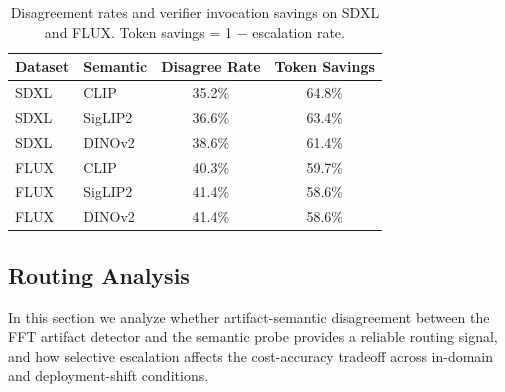 \documentclass{ieeeaccess}
\begin{document}
\begin{table}[h]
\large
\centering
\caption{Deployment shift results on SDXL and FLUX. Semantic probes are trained on
SD~1.4 and tested without retraining. Cascade escalates to GPT-5.5 on disagreement
cases. Gain = cascade accuracy $-$ stale semantic accuracy}
\label{tab:e8_results}
\end{table}

\begin{table}[h]
\centering
\caption{Disagreement rates and verifier invocation savings on SDXL and FLUX. Token
savings = 1 $-$ escalation rate.}
\label{tab:e8_efficiency}
\begin{tabular}{llcc}
\toprule
Dataset & Semantic & Disagree Rate & Token Savings \\
\midrule
SDXL & CLIP    & 35.2\% & 64.8\% \\
SDXL & SigLIP2 & 36.6\% & 63.4\% \\
SDXL & DINOv2  & 38.6\% & 61.4\% \\
\midrule
FLUX & CLIP    & 40.3\% & 59.7\% \\
FLUX & SigLIP2 & 41.4\% & 58.6\% \\
FLUX & DINOv2  & 41.4\% & 58.6\% \\
\bottomrule
\end{tabular}
\end{table}



\subsection{Routing Analysis}

In this section we analyze whether artifact-semantic disagreement between the FFT artifact detector and
the semantic probe provides a reliable routing signal, and how selective escalation
affects the cost-accuracy tradeoff across in-domain and deployment-shift conditions.
\end{document}
